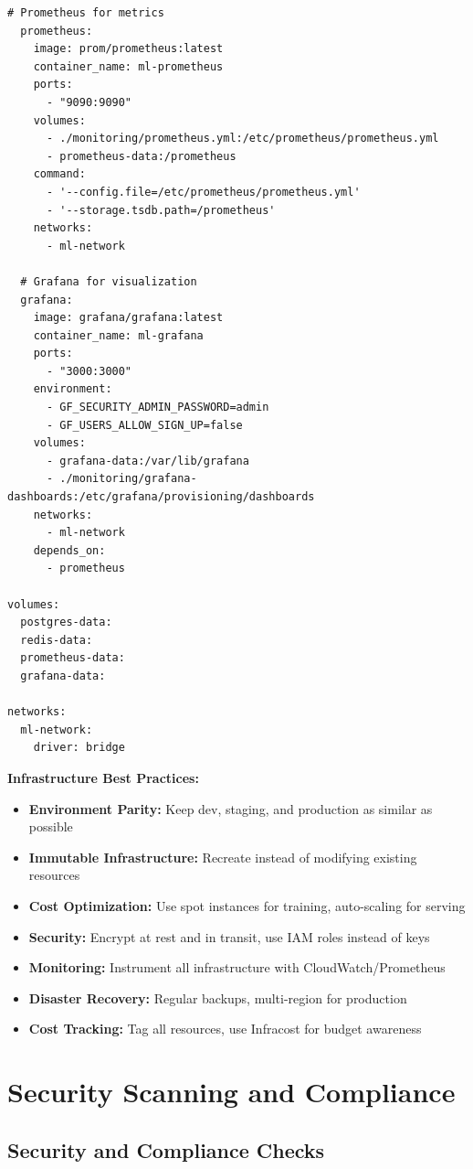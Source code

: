 \begin{lstlisting}[style=yaml, caption=Docker Compose for Local ML Environment]
  # Prometheus for metrics
  prometheus:
    image: prom/prometheus:latest
    container_name: ml-prometheus
    ports:
      - "9090:9090"
    volumes:
      - ./monitoring/prometheus.yml:/etc/prometheus/prometheus.yml
      - prometheus-data:/prometheus
    command:
      - '--config.file=/etc/prometheus/prometheus.yml'
      - '--storage.tsdb.path=/prometheus'
    networks:
      - ml-network

  # Grafana for visualization
  grafana:
    image: grafana/grafana:latest
    container_name: ml-grafana
    ports:
      - "3000:3000"
    environment:
      - GF_SECURITY_ADMIN_PASSWORD=admin
      - GF_USERS_ALLOW_SIGN_UP=false
    volumes:
      - grafana-data:/var/lib/grafana
      - ./monitoring/grafana-dashboards:/etc/grafana/provisioning/dashboards
    networks:
      - ml-network
    depends_on:
      - prometheus

volumes:
  postgres-data:
  redis-data:
  prometheus-data:
  grafana-data:

networks:
  ml-network:
    driver: bridge
\end{lstlisting}

\textbf{Infrastructure Best Practices:}

\begin{itemize}
    \item \textbf{Environment Parity:} Keep dev, staging, and production as similar as possible
    \item \textbf{Immutable Infrastructure:} Recreate instead of modifying existing resources
    \item \textbf{Cost Optimization:} Use spot instances for training, auto-scaling for serving
    \item \textbf{Security:} Encrypt at rest and in transit, use IAM roles instead of keys
    \item \textbf{Monitoring:} Instrument all infrastructure with CloudWatch/Prometheus
    \item \textbf{Disaster Recovery:} Regular backups, multi-region for production
    \item \textbf{Cost Tracking:} Tag all resources, use Infracost for budget awareness
\end{itemize}

\section{Security Scanning and Compliance}

\subsection{Security and Compliance Checks}

